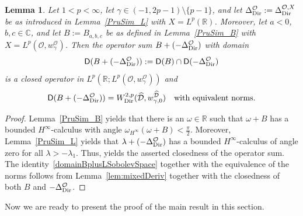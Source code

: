 \documentclass[12pt,a4paper, reqno]{amsart}
\theoremstyle{plain}
\newtheorem{lemma}[theorem]{Lemma}
\theoremstyle{definition}
\theoremstyle{remark}
\numberwithin{equation}{section}
\newcommand{\1}{\mathbbm{1}}
\newcommand{\R}{\ensuremath{\mathbb{R}}}
\newcommand{\C}{\ensuremath{\mathbb{C}}}
\newcommand{\calO}{\ensuremath{\mathcal{O}}}
\newcommand{\calD}{\ensuremath{\mathcal{D}}}
\newcommand{\sfD}{\ensuremath{\mathsf{D}}}
\newcommand{\Dir}{\textup{Dir}}
\begin{document}
\begin{lemma}\label{PruSim:domain:B+L}
Let $1<p<\infty$, let $\gamma\in (-1,2p-1)\setminus\{p-1\}$, and
let $\Delta_\Dir^\calO:=\Delta_\Dir^{\calO,X}$ be as introduced in Lemma~\ref{PruSim_L} with $X=L^p(\R)$.
Moreover, let $a<0$,  $b,c\in\C$, and let $B:=B_{a,b,c}$ be as defined in Lemma~\ref{PruSim_B} with $X=L^p(\calO,w_\gamma^\calO)$.
Then the operator sum $B+(-\Delta_\Dir^\calO)$ with domain
\[
\sfD(B+(-\Delta_\Dir^\calO))
    :=
\sfD(B)\cap \sfD(-\Delta_\Dir^\calO)
\]
is a closed operator in $L^p(\R;L^p(\calO,w_\gamma^\calO))$ and
\begin{equation}\label{domainBplusLSobolevSpace}
	\sfD(B+(-\Delta_\Dir^\calO))
    =
    W^{2,p}_{\textup{Dir}}(\widehat{\calD},w_{\gamma,0}^{\widehat{\calD}})
    \quad\text{with equivalent norms}.
\end{equation}
\end{lemma}
\begin{proof}
Lemma~\ref{PruSim_B} yields that there is an $\omega\in\R$ such that $\omega+B$ has a bounded $H^\infty$-calculus with angle $\omega_{H^\infty}(\omega+B)<\frac{\pi}{2}$.
Moreover, Lemma~\ref{PruSim_L} yields that $\lambda+(-\Delta_\Dir^\calO)$ has a bounded $H^\infty$-calculus of angle zero for all $\lambda>-\lambda_1$.
Thus, \cite[Theorem~8.5]{Prss1993EvolutionaryIE} yields the asserted closedness of the operator sum.
The identity~\eqref{domainBplusLSobolevSpace} together with the equivalence of the norms follows from Lemma~\ref{lem:mixedDeriv} together with the closedness of both $B$ and $-\Delta_\Dir^\calO$.
\end{proof}

Now we are ready to present the proof of the main result in this section.
\end{document}
